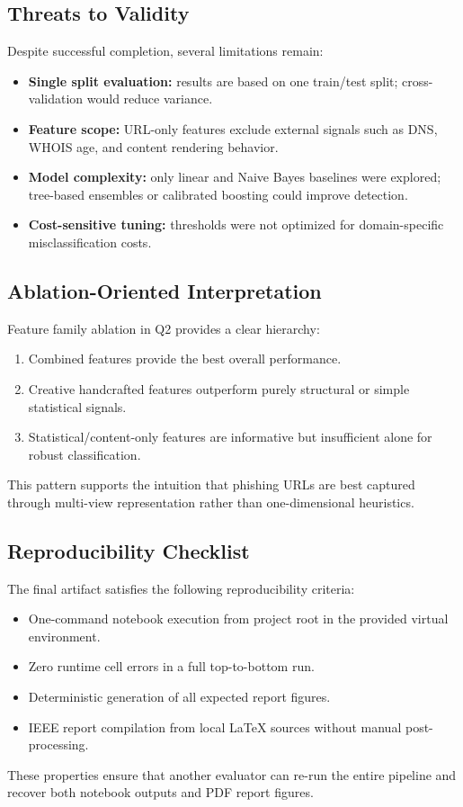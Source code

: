 \subsection{Threats to Validity}

Despite successful completion, several limitations remain:
\begin{itemize}
    \item \textbf{Single split evaluation:} results are based on one train/test split; cross-validation would reduce variance.
    \item \textbf{Feature scope:} URL-only features exclude external signals such as DNS, WHOIS age, and content rendering behavior.
    \item \textbf{Model complexity:} only linear and Naive Bayes baselines were explored; tree-based ensembles or calibrated boosting could improve detection.
    \item \textbf{Cost-sensitive tuning:} thresholds were not optimized for domain-specific misclassification costs.
\end{itemize}

\subsection{Ablation-Oriented Interpretation}

Feature family ablation in Q2 provides a clear hierarchy:
\begin{enumerate}
    \item Combined features provide the best overall performance.
    \item Creative handcrafted features outperform purely structural or simple statistical signals.
    \item Statistical/content-only features are informative but insufficient alone for robust classification.
\end{enumerate}

This pattern supports the intuition that phishing URLs are best captured through multi-view representation rather than one-dimensional heuristics.

\subsection{Reproducibility Checklist}

The final artifact satisfies the following reproducibility criteria:
\begin{itemize}
    \item One-command notebook execution from project root in the provided virtual environment.
    \item Zero runtime cell errors in a full top-to-bottom run.
    \item Deterministic generation of all expected report figures.
    \item IEEE report compilation from local LaTeX sources without manual post-processing.
\end{itemize}

These properties ensure that another evaluator can re-run the entire pipeline and recover both notebook outputs and PDF report figures.
